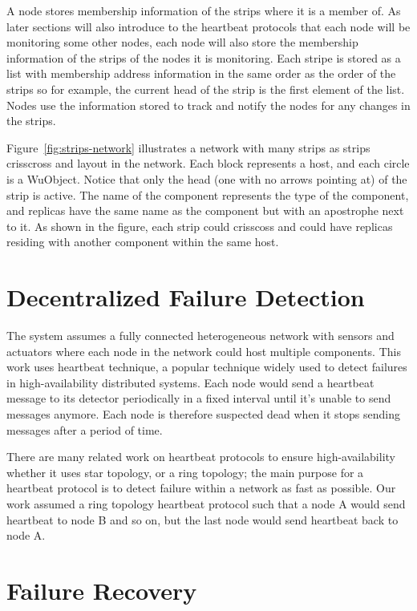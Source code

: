 A node stores membership information of the strips where it is a member of. As
later sections will also introduce to the heartbeat protocols that each node will
be monitoring some other nodes, each node will also store the membership
information of the strips of the nodes it is monitoring. Each stripe is stored
as a list with membership address information in the same order as the order of the
strips so for example, the current head of the strip is the first element of
the list. Nodes use the information stored to track and notify the nodes for
any changes in the strips.

Figure~\ref{fig:strips-network} illustrates a network with many strips as
strips crisscross and layout in the network. Each block represents a host, and
each circle is a WuObject. Notice that only the head (one with no arrows
pointing at) of the strip is active. The name of the component represents the
type of the component, and replicas have the same name as the component but
with an apostrophe next to it. As shown in the figure, each strip could
crisscoss and could have replicas residing with another component within the
same host.

\section{Decentralized Failure Detection}
\label{s:dfd}

The system assumes a fully connected heterogeneous network with sensors and
actuators where each node in the network could host multiple components. This
work uses heartbeat technique, a popular technique widely used to detect
failures in high-availability distributed systems. Each node would send
a heartbeat message to its detector periodically in a fixed interval
until it's unable to send messages anymore. Each node is therefore suspected
dead when it stops sending messages after a period of time.

There are many related work on heartbeat protocols to ensure high-availability
whether it uses star topology, or a ring topology; the main purpose for
a heartbeat protocol is to detect failure within a network as fast as possible.
Our work assumed a ring topology heartbeat protocol such that a node A would
send heartbeat to node B and so on, but the last node would send heartbeat back
to node A.

\section{Failure Recovery}
\label{s:fr}


